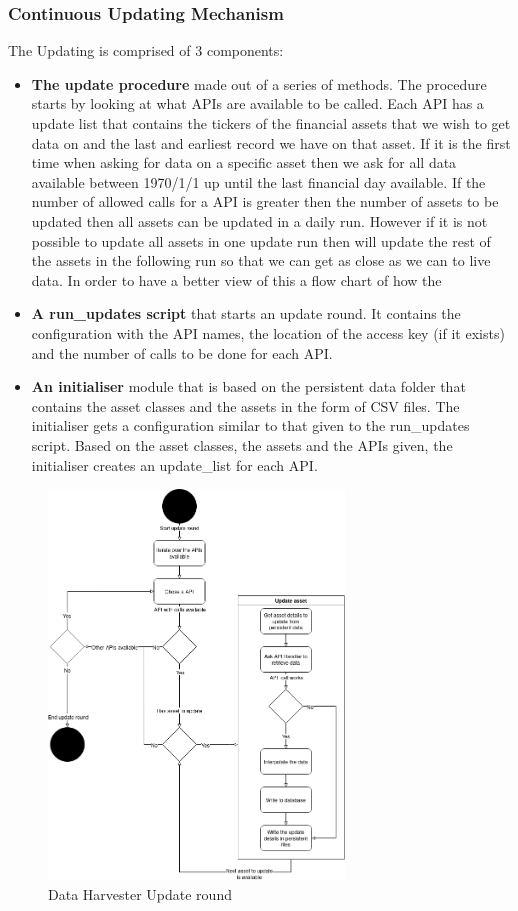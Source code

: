 \documentclass[main.tex]{subfiles}
\begin{document}
\subsubsection{Continuous Updating Mechanism}
The Updating is comprised of 3 components:
\begin{itemize}
    \item \textbf{The update procedure} made out of a series of methods. The procedure starts by looking at what APIs are available to be called. Each API has a update list that contains the tickers of the financial assets that we wish to get data on and the last and earliest record we have on that asset. If it is the first time when asking for data on a specific asset then we ask for all data available between 1970/1/1 up until the last financial day available. If the number of allowed calls for a API is greater then the number of assets to be updated then all assets can be updated in a daily run. However if it is not possible to update all assets in one update run then will update the rest of the assets in the following run so that we can get as close as we can to live data. In order to have a better view of this a flow chart of how the 
    \item \textbf{A run\_updates script} that starts an update round. It contains the configuration with the API names, the location of the access key (if it exists) and the number of calls to be done for each API. 
    \item \textbf{An initialiser} module that is based on the persistent data folder that contains the asset classes and the assets in the form of CSV files. The initialiser gets a configuration similar to that given to the run\_updates script. Based on the asset classes, the assets and the APIs given, the initialiser creates an update\_list for each API.
\end{itemize}

\begin{figure}[H]
    \centering
    \caption{Data Harvester Update round\cite{TR}}
	\includegraphics[width=0.7\textwidth]{04Design/04Pictures/update_mechanism_flow_chart.png}
\end{figure}
\end{document}
